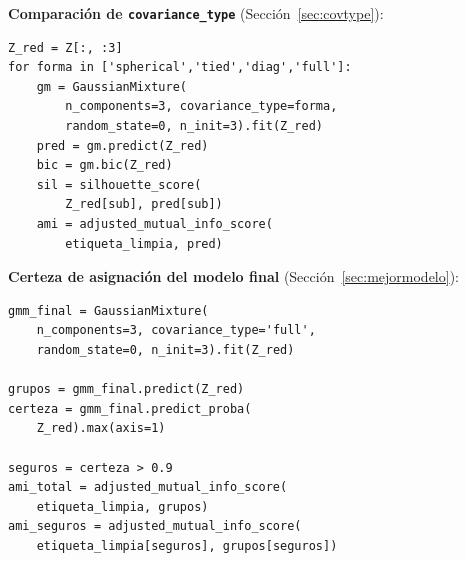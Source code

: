 \documentclass[10pt,journal]{IEEEtran}
\begin{document}
  \textbf{Comparaci\'on de \texttt{covariance\_type}} (Secci\'on~\ref{sec:covtype}):
  \begin{lstlisting}
Z_red = Z[:, :3]
for forma in ['spherical','tied','diag','full']:
    gm = GaussianMixture(
        n_components=3, covariance_type=forma,
        random_state=0, n_init=3).fit(Z_red)
    pred = gm.predict(Z_red)
    bic = gm.bic(Z_red)
    sil = silhouette_score(
        Z_red[sub], pred[sub])
    ami = adjusted_mutual_info_score(
        etiqueta_limpia, pred)
  \end{lstlisting}

  \textbf{Certeza de asignaci\'on del modelo final} (Secci\'on~\ref{sec:mejormodelo}):
  \begin{lstlisting}
gmm_final = GaussianMixture(
    n_components=3, covariance_type='full',
    random_state=0, n_init=3).fit(Z_red)

grupos = gmm_final.predict(Z_red)
certeza = gmm_final.predict_proba(
    Z_red).max(axis=1)

seguros = certeza > 0.9
ami_total = adjusted_mutual_info_score(
    etiqueta_limpia, grupos)
ami_seguros = adjusted_mutual_info_score(
    etiqueta_limpia[seguros], grupos[seguros])
  \end{lstlisting}

  
  
\end{document}
